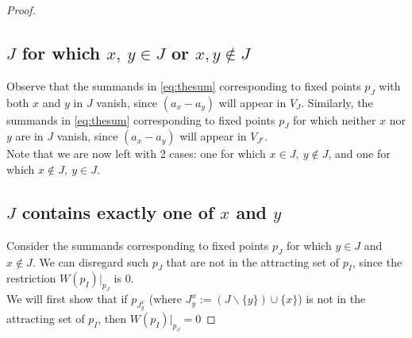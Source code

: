 \documentclass[10pt,a4paper]{amsart}
\begin{document}
\begin{proof}
\subsection{$J$ for which $x,\ y\in J$ or $x,y \not\in J$} 
Observe that the summands in \eqref{eq:thesum} corresponding to fixed points $p_J$ with both $x$ and $y$ in $J$ vanish, since $(a_x - a_y)$ will appear in $V_J$. Similarly, the summands in \eqref{eq:thesum} corresponding to fixed points $p_J$ for which neither $x$ nor $y$ are in $J$ vanish, since $(a_{x}-a_{y})$ will appear in $V_{J^{c}}$. \\

Note that we are now left with 2 cases: one for which $x\in J,\ y\notin J$, and one for which $x\notin J,\ y\in J$.\\
\subsection{$J$ contains exactly one of $x$ and $y$}
 Consider the summands corresponding to fixed points $p_{J}$ for which $y \in J$ and $x \notin J$. We can disregard such $p_{J}$ that are not in the attracting set of $p_{I}$, since the restriction $W(p_I)|_{p_J}$ is 0.\\


We will first show that if $p_{J_{y}^{x}}$ (where $J^{x}_{y}:=\left(J\backslash\{y\}\right)\cup\{x\}$) is not in the attracting set of $p_{I}$, then $W(p_{I})|_{p_{J}}=0$ 



\end{proof}
\end{document}
